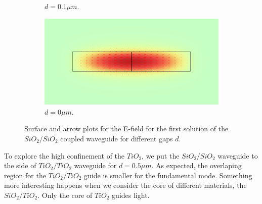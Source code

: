 \documentclass[a4paper,12pt]{article}
\begin{document}
\begin{figure}[H]
\begin{subfigure}{0.45\textwidth}
        \caption{$d = 0.1\mu m$.}
    \end{subfigure}
    \hfill
    \begin{subfigure}{0.45\textwidth}
        \centering
        \includegraphics[scale=0.32]{SiO2_SiO2_normE_0_d0um.png}
        \caption{$d = 0\mu m$.}
    \end{subfigure}
    \caption{Surface and arrow plots for the E-field for the first solution of the $SiO_2/SiO_2$ coupled waveguide for different gaps $d$.}
    \label{fig:varying_d}
\end{figure}

To explore the high confinement of the $TiO_2$, we put the $SiO_2/SiO_2$ waveguide to the side of $TiO_2/TiO_2$ waveguide for $d = 0.5\mu m$. As expected, the overlaping region for the $TiO_2/TiO_2$ guide is smaller for the fundamental mode. Something more interesting happens when we consider the core of different materials, the $SiO_2/TiO_2$. Only the core of $TiO_2$ guides light.
\end{document}
